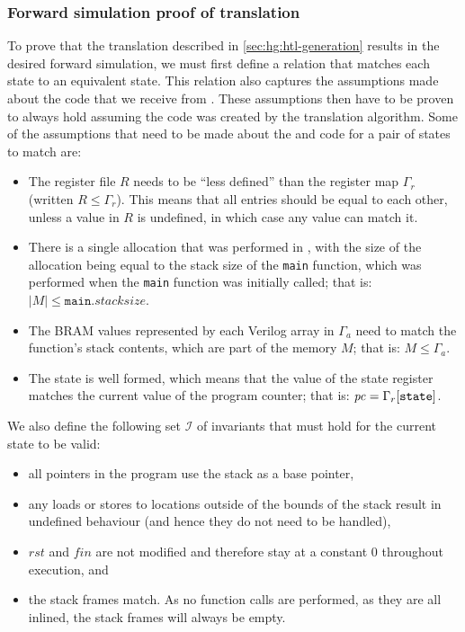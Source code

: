 \subsubsection{Forward simulation proof of translation}

To prove that the translation described in \cref{sec:hg:htl-generation} results
in the desired forward simulation, we must first define a relation that matches
each \rtlsubpar{} state to an equivalent \htl{} state.  This relation also
captures the assumptions made about the \rtlsubpar{} code that we receive from
\compcert{}.  These assumptions then have to be proven to always hold assuming
the \htl{} code was created by the translation algorithm.  Some of the
assumptions that need to be made about the \rtlsubpar{} and \htl{} code for a
pair of states to match are:

\begin{itemize}
\item The \rtlsubpar{} register file $R$ needs to be \enquote{less defined} than
  the \htl{} register map $\Gamma_{r}$ (written $R \le \Gamma_{r}$). This means
  that all entries should be equal to each other, unless a value in $R$ is
  undefined, in which case any value can match it.
\item There is a single allocation that was performed in \rtlsubpar{}, with the
  size of the allocation being equal to the stack size of the \texttt{main}
  function, which was performed when the \texttt{main} function was initially
  called; that is: $|M| \le \texttt{main}.\mathit{stacksize}$.
\item The \gls{BRAM} values represented by each Verilog array in $\Gamma_{a}$ need to
  match the \rtlsubpar{} function's stack contents, which are part of the memory $M$;
  that is: $M \le \Gamma_{a}$.
\item The state is well formed, which means that the value of the state register
  matches the current value of the program counter; that is:
  $\mathit{pc} = \Gamma_{r}[\texttt{state}]$.
\end{itemize}

We also define the following set $\mathcal{I}$ of invariants that must hold for
the current state to be valid:

\begin{itemize}
\item all pointers in the program use the stack as a base pointer,
\item any loads or stores to locations outside of the bounds of the stack result
  in undefined behaviour (and hence they do not need to be handled),
\item $\mathit{rst}$ and $\mathit{fin}$ are not modified and therefore stay at a
  constant 0 throughout execution, and
\item the stack frames match.  As no function calls are performed, as they are
  all inlined, the stack frames will always be empty.
\end{itemize}

